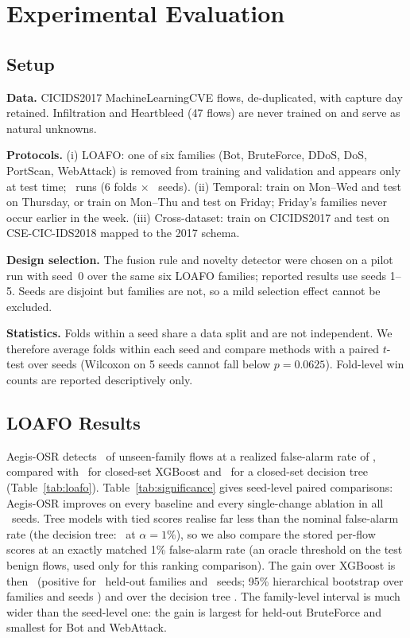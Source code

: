 \documentclass[conference]{IEEEtran}
\begin{document}
\section{Experimental Evaluation}
\subsection{Setup}
\textbf{Data.} CICIDS2017 MachineLearningCVE flows, de-duplicated, with capture day retained. Infiltration and Heartbleed (47 flows) are never trained on and serve as natural unknowns.

\textbf{Protocols.} (i) LOAFO: one of six families (Bot, BruteForce, DDoS, DoS, PortScan, WebAttack) is removed from training and validation and appears only at test time; \LoafoRecords\ runs (6 folds $\times$ \LoafoSeeds\ seeds). (ii) Temporal: train on Mon--Wed and test on Thursday, or train on Mon--Thu and test on Friday; Friday's families never occur earlier in the week. (iii) Cross-dataset: train on CICIDS2017 and test on CSE-CIC-IDS2018 mapped to the 2017 schema.

\textbf{Design selection.} The fusion rule and novelty detector were chosen on a pilot run with seed~0 over the same six LOAFO families; reported results use seeds 1--5. Seeds are disjoint but families are not, so a mild selection effect cannot be excluded.

\textbf{Statistics.} Folds within a seed share a data split and are not independent. We therefore average folds within each seed and compare methods with a paired $t$-test over seeds (Wilcoxon on 5 seeds cannot fall below $p=0.0625$). Fold-level win counts are reported descriptively only.



\subsection{LOAFO Results}
Aegis-OSR detects \LoafoOsrZdr\ of unseen-family flows at a realized false-alarm rate of \LoafoOsrFpr, compared with \LoafoXgbZdr\ for closed-set XGBoost and \LoafoDtZdr\ for a closed-set decision tree (Table~\ref{tab:loafo}). Table~\ref{tab:significance} gives seed-level paired comparisons: Aegis-OSR improves on every baseline and every single-change ablation in all \LoafoSeeds\ seeds. Tree models with tied scores realise far less than the nominal false-alarm rate (the decision tree: \FactRaLoafoDtFpr\ at $\alpha=1\%$), so we also compare the stored per-flow scores at an exactly matched 1\% false-alarm rate (an oracle threshold on the test benign flows, used only for this ranking comparison). The gain over XGBoost is then \FactRaLoafoXgbMatched\ (positive for \FactRaLoafoXgbMatchedGroups\ held-out families and \FactRaLoafoXgbMatchedSeeds\ seeds; 95\% hierarchical bootstrap over families and seeds \FactRaLoafoXgbMatchedCi) and over the decision tree \FactRaLoafoDtMatched. The family-level interval is much wider than the seed-level one: the gain is largest for held-out BruteForce and smallest for Bot and WebAttack.
\end{document}
